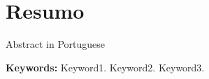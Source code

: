 \thispagestyle{empty}

\chapter*{Resumo}


\vspace*{10mm}

Abstract in Portuguese

\vspace*{15mm}

\textbf{Keywords:} Keyword1.  Keyword2.  Keyword3.
